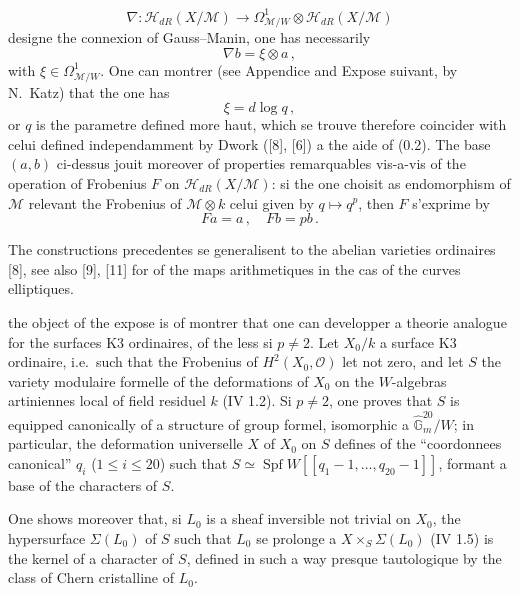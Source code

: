 \documentclass[12pt,a4paper]{article}
\theoremstyle{plain}
\theoremstyle{definition}
\theoremstyle{remark}
\DeclareMathOperator{\Spf}{Spf}
\begin{document}
\[
\nabla : \mathcal{H}_{dR}(X/\mathcal{M}) \longrightarrow \Omega^1_{\mathcal{M}/W} \otimes \mathcal{H}_{dR}(X/\mathcal{M})
\]
designe the connexion of Gauss--Manin, one has necessarily
\begin{equation}\label{eq:0.1}
\nabla b = \xi \otimes a\,,
\end{equation}
with $\xi \in \Omega^1_{\mathcal{M}/W}$. One can montrer (see Appendice and Expose suivant, by N.\ Katz) that the one has
\begin{equation}\label{eq:0.2}
\xi = d\log q\,,
\end{equation}
or $q$ is the parametre defined more haut, which se trouve therefore coincider with celui defined independamment by Dwork ([8], [6]) a the aide of (0.2). The base $(a,b)$ ci-dessus jouit moreover of properties remarquables vis-a-vis of the operation of Frobenius $F$ on $\mathcal{H}_{dR}(X/\mathcal{M})$: si the one choisit as endomorphism of $\mathcal{M}$ relevant the Frobenius of $\mathcal{M} \otimes k$ celui given by $q \mapsto q^p$, then $F$ s'exprime by
\begin{equation}\label{eq:0.3}
Fa = a\,, \quad Fb = pb\,.
\end{equation}

The constructions precedentes se generalisent to the abelian varieties ordinaires [8], see also [9], [11] for of the maps arithmetiques in the cas of the curves elliptiques.

the object of the expose is of montrer that one can developper a theorie analogue for the surfaces K3 ordinaires, of the less si $p \neq 2$. Let $X_0/k$ a surface K3 ordinaire, i.e.\ such that the Frobenius of $H^2(X_0, \mathcal{O})$ let not zero, and let $S$ the variety modulaire formelle of the deformations of $X_0$ on the $W$-algebras artiniennes local of field residuel $k$ (IV 1.2). Si $p \neq 2$, one proves that $S$ is equipped canonically of a structure of group formel, isomorphic a $\widehat{\mathbb{G}}_m^{20}/W$; in particular, the deformation universelle $X$ of $X_0$ on $S$ defines of the ``coordonnees canonical'' $q_i$ ($1 \leq i \leq 20$) such that $S \simeq \Spf W[[q_1-1, \ldots, q_{20}-1]]$, formant a base of the characters of $S$.

One shows moreover that, si $L_0$ is a sheaf inversible not trivial on $X_0$, the hypersurface $\Sigma(L_0)$ of $S$ such that $L_0$ se prolonge a $X \times_S \Sigma(L_0)$ (IV 1.5) is the kernel of a character of $S$, defined in such a way presque tautologique by the class of Chern cristalline of $L_0$.
\end{document}

